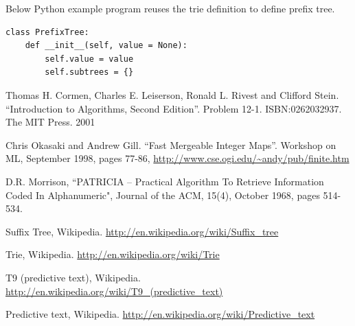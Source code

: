 \documentclass[b5paper]{article}
\begin{document}
Below Python example program reuses the trie definition to define prefix tree.

\lstset{language=Python}
\begin{lstlisting}
class PrefixTree:
    def __init__(self, value = None):
        self.value = value
        self.subtrees = {}
\end{lstlisting}

\ifx\wholebook\relax \else
\begin{thebibliography}{99}

Thomas H. Cormen, Charles E. Leiserson, Ronald L. Rivest and Clifford Stein.
``Introduction to Algorithms, Second Edition''. Problem 12-1. ISBN:0262032937. The MIT Press. 2001

Chris Okasaki and Andrew Gill. ``Fast Mergeable Integer
Maps''. Workshop on ML, September 1998, pages 77-86, \url{http://www.cse.ogi.edu/~andy/pub/finite.htm}

D.R. Morrison, ``PATRICIA -- Practical Algorithm To Retrieve  Information Coded In Alphanumeric", Journal of the ACM, 15(4), October 1968, pages 514-534.

Suffix Tree, Wikipedia. \url{http://en.wikipedia.org/wiki/Suffix_tree}

Trie, Wikipedia. \url{http://en.wikipedia.org/wiki/Trie}

T9 (predictive text), Wikipedia. \url{http://en.wikipedia.org/wiki/T9_(predictive_text)}

Predictive text,
Wikipedia. \url{http://en.wikipedia.org/wiki/Predictive_text}

\end{thebibliography}

\expandafter\enddocument
\fi
\end{document}
